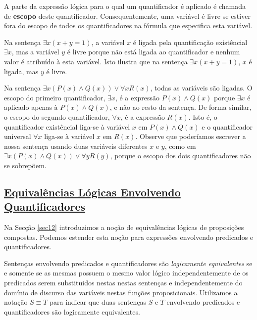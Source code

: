 A parte da expressão lógica para o qual um quantificador é aplicado é chamada de
\textbf{escopo} deste quantificador. Consequentemente, uma variável é livre se
estiver fora do escopo de todos os quantificadores na fórmula que especifica
esta variável.

\begin{exmp}
\label{exem142}
Na sentença $\exists x(x+y=1)$, a variável $x$ é ligada pela quantificação
existêncial $\exists x$, mas a variável $y$ é livre porque não está ligada ao
quantificador e nenhum valor é atribuído à esta variável. Isto ilustra que na
sentença $\exists x(x+y=1)$, $x$ é ligada, mas $y$ é livre.

Na sentença $\exists x(P(x) \land Q(x)) \lor \forall xR(x)$, todas as variáveis
são ligadas. O escopo do primeiro quantificador, $\exists x$, é a expressão
$P(x) \land Q(x)$ porque $\exists x$ é aplicado apenas à $P(x) \land Q(x)$, e
não ao resto da sentença. De forma similar, o escopo do segundo quantificador,
$\forall x$, é a expressão $R(x)$. Isto é, o quantificador existêncial liga-se à
variável $x$ em $P(x) \land Q(x)$ e o quantificador universal $\forall x$
liga-se à variável $x$ em $R(x)$. Observe que poderíamos escrever a nossa
sentença usando duas variáveis diferentes $x$ e $y$, como em $\exists x(P(x)
\land Q(x)) \lor \forall yR(y)$, porque o escopo dos dois quantificadores não se
sobrepõem. 
\end{exmp} 


\subsection*{\underline{Equivalências Lógicas Envolvendo Quantificadores}}

Na Secção \ref{sec12} introduzimos a noção de equivalências lógicas de
proposições compostas. Podemos estender esta noção para expressões envolvendo
predicados e quantificadores.

\label{def111}
\begin{defn}
Sentenças envolvendo predicados e quantificadores são \emph{logicamente
equivalentes} se e somente se as mesmas possuem o mesmo valor lógico
independentemente de os predicados serem substituidos nestas nestas sentenças e
independentemente do domínio de discurso das variáveis nestas funções
proposicionais. Utilizamos a notação $S \equiv T$ para indicar que duas
sentenças $S$ e $T$ envolvendo predicados e quantificadores são logicamente
equivalentes.
\end{defn}

